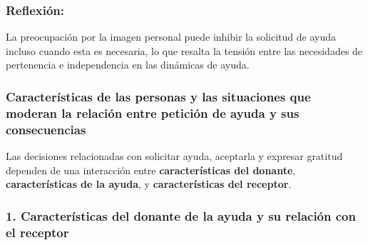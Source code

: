 \documentclass[
]{book}
\begin{document}
\subsubsection{Reflexión:}\label{reflexiuxf3n-2}

La preocupación por la imagen personal puede inhibir la solicitud de ayuda incluso cuando esta es necesaria, lo que resalta la tensión entre las necesidades de pertenencia e independencia en las dinámicas de ayuda.

\subsubsection{Características de las personas y las situaciones que moderan la relación entre petición de ayuda y sus consecuencias}\label{caracteruxedsticas-de-las-personas-y-las-situaciones-que-moderan-la-relaciuxf3n-entre-peticiuxf3n-de-ayuda-y-sus-consecuencias}

Las decisiones relacionadas con solicitar ayuda, aceptarla y expresar gratitud dependen de una interacción entre \textbf{características del donante}, \textbf{características de la ayuda}, y \textbf{características del receptor}.

\subsubsection{\texorpdfstring{1. \textbf{Características del donante de la ayuda y su relación con el receptor}}{1. Características del donante de la ayuda y su relación con el receptor}}\label{caracteruxedsticas-del-donante-de-la-ayuda-y-su-relaciuxf3n-con-el-receptor}
\end{document}
